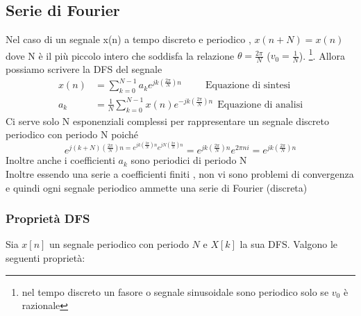 \documentclass{article}
\theoremstyle{definition}
\begin{document}
	\subsection{Serie di Fourier}
	Nel caso di un segnale x(n) a tempo discreto e periodico , $x(n+N)=x(n)$ dove N è il più piccolo intero che soddisfa la relazione $\theta=\frac{2\pi}{N}$ ($v_0=\frac{1}{N}$). \footnote{nel tempo discreto un fasore o segnale sinusoidale sono periodico solo se $v_0$ è razionale}.
	Allora possiamo scrivere la DFS del segnale 
	\begin{align*}
		x(n)&=\sum_{k=0}^{N-1} a_k e^{jk\left(\frac{2 \pi }{N}\right)n} \ \ \ \ \ \ \ \ \ \ \ \text{Equazione di sintesi}\\
		a_k&=\frac{1}{N} \sum_{k=0}^{N-1}x(n)e^{-jk\left(\frac{2 \pi }{N}\right)n}  \ \ \text{Equazione di analisi}
	\end{align*}
	Ci serve solo N esponenziali complessi per rappresentare un segnale discreto periodico con periodo N poiché 
	$$e^{j(k+N)\left(\frac{2 \pi }{N}\right)n=e^{jk\left(\frac{2 \pi }{N}\right)n} e^{jN\left(\frac{2 \pi }{N}\right)n} } =e^{jk\left(\frac{2 \pi }{N}\right)n} e^{2 \pi n i} =e^{jk\left(\frac{2 \pi }{N}\right)n} $$
	Inoltre anche i coefficienti $a_k$ sono periodici di periodo N \\
	Inoltre essendo una serie a coefficienti finiti , non vi sono problemi di convergenza e quindi ogni segnale periodico ammette una serie di Fourier (discreta)
	\subsubsection{Proprietà DFS}
	Sia \(x[n]\) un segnale periodico con periodo \(N\) e \(X[k]\) la sua DFS. Valgono le seguenti proprietà:
	
\end{document}
